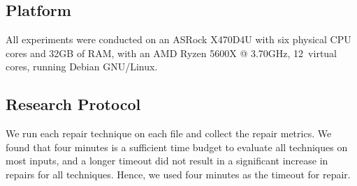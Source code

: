 \documentclass[acmsmall,screen,review,anonymous]{acmart}
\begin{document}
%

\begin{comment}
\subsection{Metrics and Measures} We employ the following metrics and measures to evaluate repair quality: 

\begin{itemize}

\item[(a.)] \textit{Number of Repaired Inputs:} We count the number of files repaired before
a four minute timeout for each repair method.
 
\item[(b.)]  \textit{File Size Difference:} To determine the amount of data recovered by each approach, 
we evaluate the difference in \emph{file size} of
the \emph{recovered inputs} and the original
\emph{valid input}. %

\item[(c.)]  \textit{Edit Distance:} This is measured as the number of characters that
differs between the \emph{corrupt input} and the \emph{repaired input}.

\item[(d.)]  \textit{Runtime} is the time taken for input repair for each method.

\item[(e.)]  \textit{Number of Program Runs:} To evaluate efficiency, we track the number of times the parser is executed by each approach. 

\end{itemize}
\end{comment}

\subsection{Platform}
All experiments were conducted
on an ASRock X470D4U with six physical CPU cores and 32GB of RAM, with an AMD Ryzen 5600X @ 3.70GHz, 12~virtual cores, running Debian GNU/Linux.


\subsection{Research Protocol}
We run each repair technique on each file and collect the repair metrics.
We found that four minutes is a sufficient time budget to evaluate all
techniques on most inputs, and a longer timeout did not result in a
significant increase in repairs for all techniques. Hence, we used four
minutes as the timeout for repair.
\end{document}
